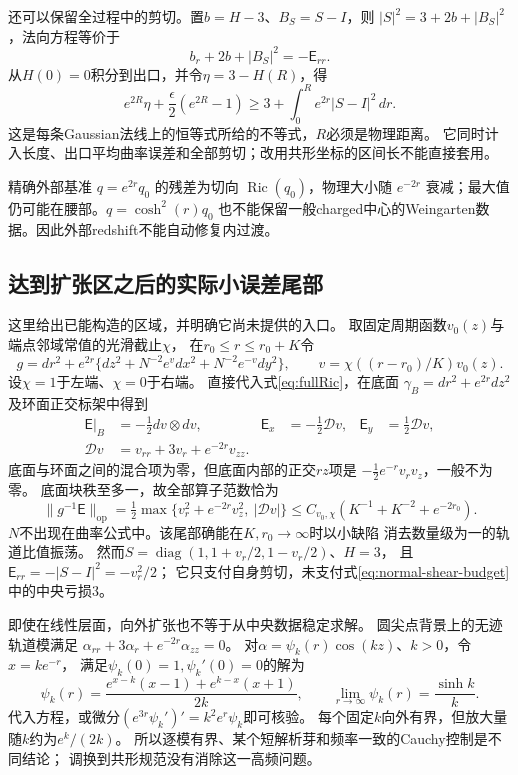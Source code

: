 \documentclass[UTF8,a4paper,11pt,fontset=fandol]{ctexart}
\numberwithin{equation}{section}
\theoremstyle{definition}
\newcommand{\Ric}{\operatorname{Ric}}
\newcommand{\op}{\mathrm{op}}
\begin{document}
还可以保留全过程中的剪切。置$b=H-3$、$B_S=S-I$，则
$|S|^2=3+2b+|B_S|^2$，法向方程等价于
\[
 b_r+2b+|B_S|^2=-\mathsf E_{rr}.
\]
从$H(0)=0$积分到出口，并令$\eta=3-H(R)$，得
\begin{equation}\label{eq:normal-shear-budget}
 e^{2R}\eta+\frac{\epsilon}{2}(e^{2R}-1)
 \ge3+\int_0^Re^{2r}|S-I|^2\,dr.
\end{equation}
这是每条Gaussian法线上的恒等式所给的不等式，$R$必须是物理距离。
它同时计入长度、出口平均曲率误差和全部剪切；改用共形坐标的区间长不能直接套用。

精确外部基准 $q=e^{2r}q_0$ 的残差为切向 $\Ric(q_0)$，物理大小随 $e^{-2r}$ 衰减；最大值仍可能在腰部。$q=\cosh^2(r)q_0$ 也不能保留一般charged中心的Weingarten数据。因此外部redshift不能自动修复内过渡。

\subsection{达到扩张区之后的实际小误差尾部}\label{sec:adiabatic-tail}
这里给出已能构造的区域，并明确它尚未提供的入口。
取固定周期函数$v_0(z)$与端点邻域常值的光滑截止$\chi$，
在$r_0\le r\le r_0+K$令
\[
 g=dr^2+e^{2r}\{dz^2+N^{-2}e^v dx^2+N^{-2}e^{-v}dy^2\},
 \qquad v=\chi((r-r_0)/K)v_0(z).
\]
设$\chi=1$于左端、$\chi=0$于右端。
直接代入式\eqref{eq:fullRic}，在底面
$\gamma_B=dr^2+e^{2r}dz^2$及环面正交标架中得到
\begin{align}
 \mathsf E|_B&=-\tfrac12dv\otimes dv,&
 \mathsf E_x&=-\tfrac12\mathcal Dv,&
 \mathsf E_y&=\tfrac12\mathcal Dv,\nonumber\\
 \mathcal Dv&=v_{rr}+3v_r+e^{-2r}v_{zz}.&&&
 \label{eq:explicit-tail}
\end{align}
底面与环面之间的混合项为零，但底面内部的正交$rz$项是
$-\frac12e^{-r}v_rv_z$，一般不为零。
底面块秩至多一，故全部算子范数恰为
\begin{equation}\label{eq:explicit-tail-norm}
 \|g^{-1}\mathsf E\|_\op
 =\tfrac12\max\{v_r^2+e^{-2r}v_z^2,\ |\mathcal Dv|\}
 \le C_{v_0,\chi}(K^{-1}+K^{-2}+e^{-2r_0}).
\end{equation}
$N$不出现在曲率公式中。该尾部确能在$K,r_0\to\infty$时以小缺陷
消去数量级为一的轨道比值振荡。
然而$S=\operatorname{diag}(1,1+v_r/2,1-v_r/2)$、$H=3$，
且$\mathsf E_{rr}=-|S-I|^2=-v_r^2/2$；
它只支付自身剪切，未支付式\eqref{eq:normal-shear-budget}中的中央亏损$3$。

即使在线性层面，向外扩张也不等于从中央数据稳定求解。
圆尖点背景上的无迹轨道模满足
$\alpha_{rr}+3\alpha_r+e^{-2r}\alpha_{zz}=0$。
对$\alpha=\psi_k(r)\cos(kz)$、$k>0$，令$x=ke^{-r}$，
满足$\psi_k(0)=1,\psi_k'(0)=0$的解为
\begin{equation}\label{eq:cusp-mode-amplification}
 \psi_k(r)=
 \frac{e^{x-k}(x-1)+e^{k-x}(x+1)}{2k},
 \qquad
 \lim_{r\to\infty}\psi_k(r)=\frac{\sinh k}{k}.
\end{equation}
代入方程，或微分$(e^{3r}\psi_k')'=k^2e^r\psi_k$即可核验。
每个固定$k$向外有界，但放大量随$k$约为$e^k/(2k)$。
所以逐模有界、某个短解析芽和频率一致的Cauchy控制是不同结论；
调换到共形规范没有消除这一高频问题。
\end{document}
